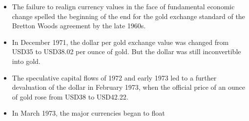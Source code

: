 \documentclass[international_finance_p1.tex]{subfiles}
\begin{document}
\begin{frame}{}
\begin{itemize}[<+->]
\item
The failure to realign currency values in the face of fundamental economic change spelled the beginning of the end for the gold exchange standard of the Bretton Woods agreement by the late 1960s.
\item
In December 1971, the dollar per gold exchange value was changed from USD35 to USD38.02 per ounce of gold. But the dollar was still inconvertible into gold.
\item
The speculative capital flows of 1972 and early 1973 led to a further devaluation of the dollar in February 1973, when the official price of an ounce of gold rose from USD38 to USD42.22.
\item
In March 1973, the major currencies began to float
\end{itemize}
\end{frame}
\end{document}
